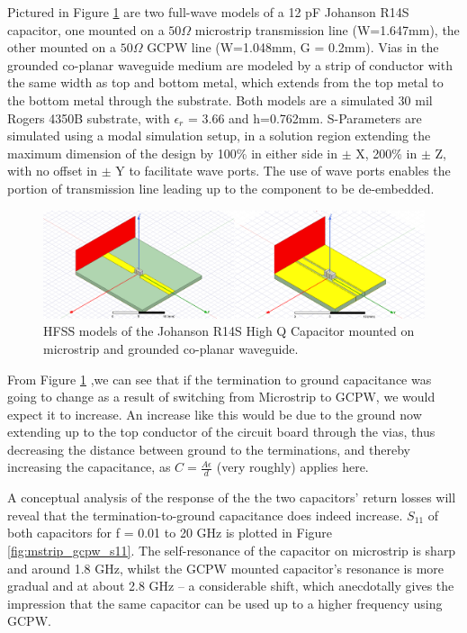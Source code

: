 \documentclass[12pt]{usfcoe}
\begin{document}
     Pictured in Figure \ref{fig:mstrip_gcpw_designs} are two full-wave models of a 12 pF Johanson R14S
    capacitor, one mounted on a \(50 \Omega\) microstrip transmission line
    (W=1.647mm), the other mounted on a \(50 \Omega\) GCPW line (W=1.048mm, G = 0.2mm). Vias in the grounded co-planar waveguide medium are modeled by a strip of conductor with the same width as top and bottom metal, which extends from the top metal to the bottom metal through the substrate. Both models are a simulated 30 mil Rogers 4350B substrate, with $\epsilon_r$ = 3.66 and h=0.762mm. S-Parameters are simulated using a modal simulation setup, in a solution region extending the maximum dimension of the design by 100\% in either side in $\pm$ X, 200\% in $ \pm$ Z, with no offset in $\pm $ Y to facilitate wave ports. The use of wave ports enables the portion of transmission line leading up to the component to be de-embedded.
    
    	\begin{figure}[H]
			\begin{center}
			\includegraphics[width=6in]{images/mstrip_v_gcpw/hfss_designs.png}
			\caption{HFSS models of the Johanson R14S High Q Capacitor mounted on microstrip and grounded co-planar waveguide.} 
			\label{fig:mstrip_gcpw_designs}
			\end{center}
		\end{figure}
            
   
       From Figure \ref{fig:mstrip_gcpw_designs} ,we can see that if the termination to ground capacitance was going to change as a result of switching from Microstrip to GCPW, we would expect it to increase. An increase like this would be due to the ground now extending up to the top conductor of the circuit board through the vias, thus decreasing the distance between ground to the terminations, and thereby increasing the capacitance, as $ C = \frac{A\epsilon}{d}$ (very roughly) applies here. 
    
        A conceptual analysis of the response of the the two capacitors' return losses will reveal that the termination-to-ground capacitance does indeed increase. \(S_{11}\) of both capacitors for f = 0.01 to 20 GHz is plotted  in Figure \ref{fig:mstrip_gcpw_s11}. The self-resonance of the capacitor on microstrip is sharp and around 1.8 GHz, whilst the GCPW mounted capacitor's resonance is more gradual and at about 2.8 GHz -- a considerable shift, which anecdotally gives the impression that the same capacitor can be used up to a higher frequency using GCPW. 
        
\end{document}
